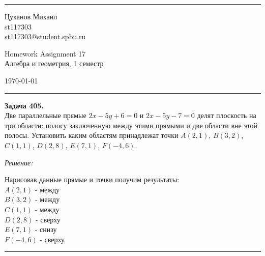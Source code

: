 \documentclass[a4paper, 12pt]{article}
\newenvironment{problem}[2][Задача]
    { \begin{mdframed}[backgroundcolor=gray!10] \textbf{#1 #2.} \\}
    {  \end{mdframed}}
\newenvironment{solution}
    {\textit{Решение: }}
    {\noindent\rule{7in}{1.5pt}}
\begin{document}

\fancyhead[C]{}
\hrule \medskip %
\begin{minipage}{0.295\textwidth}
\raggedright\footnotesize
Цуканов Михаил \hfill\\
st117303 \hfill\\
st117303@student.spbu.ru
\end{minipage}
\begin{minipage}{0.4\textwidth}
\centering\large
Homework Assignment 17\\
\normalsize
Алгебра и геометрия, 1 семестр\\
\end{minipage}
\begin{minipage}{0.295\textwidth}
\raggedleft
\today\hfill\\
\end{minipage}
\medskip\hrule
\bigskip




\begin{problem}{405}
Две параллельные прямые $2x-5y+6=0$ и $2x-5y-7=0$ делят плоскость на три области:
полосу заключенную между этими прямыми и две области вне этой полосы.
Установить каким областям принадлежат точки $A(2,1)$, $B(3,2)$, $C(1,1)$, $D(2,8)$, $E(7,1)$, $F(-4,6)$.
\end{problem}
\begin{solution}

Нарисовав данные прямые и точки получим результаты: \\
$A(2,1)$ - между \\
$B(3,2)$ - между \\
$C(1,1)$ - между \\
$D(2,8)$ - сверху \\
$E(7,1)$ - снизу \\
$F(-4,6)$ - сверху

\end{solution}
\end{document}
